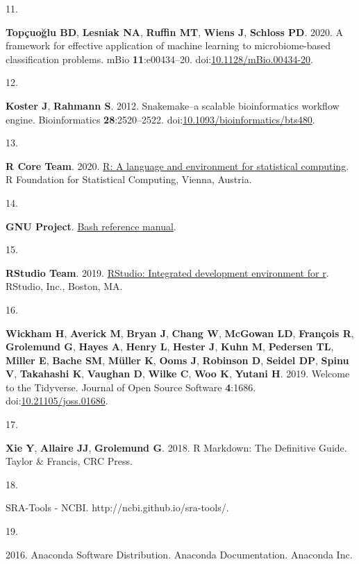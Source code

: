\documentclass[
]{article}
\newlength{\cslhangindent}
\newlength{\csllabelwidth}
\newlength{\cslentryspacingunit} %
\newenvironment{CSLReferences}[2] %
 {%
  \setlength{\parindent}{0pt}
  \ifodd #1
  \let\oldpar\par
  \def\par{\hangindent=\cslhangindent\oldpar}
  \fi
  \setlength{\parskip}{#2\cslentryspacingunit}
 }%
 {}
\newcommand{\CSLLeftMargin}[1]{\parbox[t]{\csllabelwidth}{#1}}
\newcommand{\CSLRightInline}[1]{\parbox[t]{\linewidth - \csllabelwidth}{#1}\break}
\begin{document}
\begin{CSLReferences}{0}{1}
\leavevmode{}%
\CSLLeftMargin{11. }%
\CSLRightInline{\textbf{Topçuoğlu BD}, \textbf{Lesniak NA},
\textbf{Ruffin MT}, \textbf{Wiens J}, \textbf{Schloss PD}. 2020. A
framework for effective application of machine learning to
microbiome-based classification problems. mBio \textbf{11}:e00434--20.
doi:\href{https://doi.org/10.1128/mBio.00434-20}{10.1128/mBio.00434-20}.}

\leavevmode{}%
\CSLLeftMargin{12. }%
\CSLRightInline{\textbf{Koster J}, \textbf{Rahmann S}. 2012.
Snakemake--a scalable bioinformatics workflow engine. Bioinformatics
\textbf{28}:2520--2522.
doi:\href{https://doi.org/10.1093/bioinformatics/bts480}{10.1093/bioinformatics/bts480}.}

\leavevmode{}%
\CSLLeftMargin{13. }%
\CSLRightInline{\textbf{R Core Team}. 2020.
\href{https://www.R-project.org/}{R: A language and environment for
statistical computing}. R Foundation for Statistical Computing, Vienna,
Austria.}

\leavevmode{}%
\CSLLeftMargin{14. }%
\CSLRightInline{\textbf{GNU Project}.
\href{https://www.gnu.org/software/bash/\%20manual/bash.html/}{Bash
reference manual}.}

\leavevmode{}%
\CSLLeftMargin{15. }%
\CSLRightInline{\textbf{RStudio Team}. 2019.
\href{http://www.rstudio.com/}{RStudio: Integrated development
environment for r}. RStudio, Inc., Boston, MA.}

\leavevmode{}%
\CSLLeftMargin{16. }%
\CSLRightInline{\textbf{Wickham H}, \textbf{Averick M}, \textbf{Bryan
J}, \textbf{Chang W}, \textbf{McGowan LD}, \textbf{François R},
\textbf{Grolemund G}, \textbf{Hayes A}, \textbf{Henry L}, \textbf{Hester
J}, \textbf{Kuhn M}, \textbf{Pedersen TL}, \textbf{Miller E},
\textbf{Bache SM}, \textbf{Müller K}, \textbf{Ooms J}, \textbf{Robinson
D}, \textbf{Seidel DP}, \textbf{Spinu V}, \textbf{Takahashi K},
\textbf{Vaughan D}, \textbf{Wilke C}, \textbf{Woo K}, \textbf{Yutani H}.
2019. Welcome to the Tidyverse. Journal of Open Source Software
\textbf{4}:1686.
doi:\href{https://doi.org/10.21105/joss.01686}{10.21105/joss.01686}.}

\leavevmode{}%
\CSLLeftMargin{17. }%
\CSLRightInline{\textbf{Xie Y}, \textbf{Allaire JJ}, \textbf{Grolemund
G}. 2018. R {Markdown}: {The Definitive Guide}. {Taylor \& Francis, CRC
Press}.}

\leavevmode{}%
\CSLLeftMargin{18. }%
\CSLRightInline{{SRA}-{Tools} - {NCBI}.
http://ncbi.github.io/sra-tools/.}

\leavevmode{}%
\CSLLeftMargin{19. }%
\CSLRightInline{2016. Anaconda {Software Distribution}. Anaconda
Documentation. Anaconda Inc.}

\end{CSLReferences}
\end{document}
